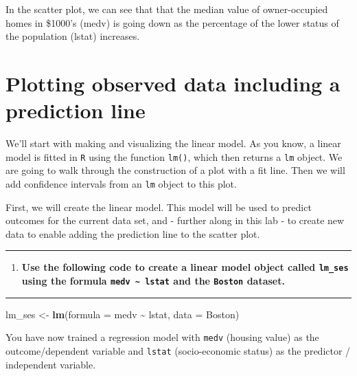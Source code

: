 \documentclass[
  12pt,
]{article}
\newenvironment{Shaded}{\begin{snugshade}}{\end{snugshade}}
\newcommand{\AttributeTok}[1]{\textcolor[rgb]{0.13,0.29,0.53}{#1}}
\newcommand{\FunctionTok}[1]{\textcolor[rgb]{0.13,0.29,0.53}{\textbf{#1}}}
\newcommand{\NormalTok}[1]{#1}
\newcommand{\OtherTok}[1]{\textcolor[rgb]{0.56,0.35,0.01}{#1}}
\newcommand{\SpecialCharTok}[1]{\textcolor[rgb]{0.81,0.36,0.00}{\textbf{#1}}}
\providecommand{\tightlist}{%
  \setlength{\itemsep}{0pt}\setlength{\parskip}{0pt}}
\begin{document}
In the scatter plot, we can see that that the median value of
owner-occupied homes in \$1000's (medv) is going down as the percentage
of the lower status of the population (lstat) increases.

\hypertarget{plotting-observed-data-including-a-prediction-line}{%
\section{Plotting observed data including a prediction
line}\label{plotting-observed-data-including-a-prediction-line}}

We'll start with making and visualizing the linear model. As you know, a
linear model is fitted in \texttt{R} using the function \texttt{lm()},
which then returns a \texttt{lm} object. We are going to walk through
the construction of a plot with a fit line. Then we will add confidence
intervals from an \texttt{lm} object to this plot.

First, we will create the linear model. This model will be used to
predict outcomes for the current data set, and - further along in this
lab - to create new data to enable adding the prediction line to the
scatter plot.

\begin{center}\rule{0.5\linewidth}{0.5pt}\end{center}

\begin{enumerate}
\def\labelenumi{\arabic{enumi}.}
\tightlist
\item
  \textbf{Use the following code to create a linear model object called
  \texttt{lm\_ses} using the formula
  \texttt{medv\ \textasciitilde{}\ lstat} and the \texttt{Boston}
  dataset.}
\end{enumerate}

\begin{center}\rule{0.5\linewidth}{0.5pt}\end{center}

\begin{Shaded}
\begin{Highlighting}[]
\NormalTok{lm\_ses }\OtherTok{\textless{}{-}} \FunctionTok{lm}\NormalTok{(}\AttributeTok{formula =}\NormalTok{ medv }\SpecialCharTok{\textasciitilde{}}\NormalTok{ lstat, }\AttributeTok{data =}\NormalTok{ Boston)}
\end{Highlighting}
\end{Shaded}

You have now trained a regression model with \texttt{medv} (housing
value) as the outcome/dependent variable and \texttt{lstat}
(socio-economic status) as the predictor / independent variable.
\end{document}
